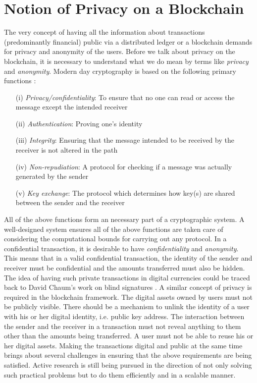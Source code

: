 \section{Notion of Privacy on a Blockchain}

The very concept of having all the information about transactions (predominantly financial) public via a distributed ledger or a blockchain demands for privacy and anonymity of the users.
Before we talk about privacy on the blockchain, it is necessary to understand what we do mean by terms like \textit{privacy} and \textit{anonymity}.
Modern day cryptography is based on the following primary functions \cite{kesler98}:
\begin{enumerate}
    \item[(i)] \textit{Privacy/confidentiality}: To ensure that no one can read or access the message except the intended receiver
    \item[(ii)] \textit{Authentication}: Proving one's identity
    \item[(iii)] \textit{Integrity}: Ensuring that the message intended to be received by the receiver is not altered in the path
    \item[(iv)] \textit{Non-repudiation}: A protocol for checking if a message was actually generated by the sender
    \item[(v)] \textit{Key exchange}: The protocol which determines how key(s) are shared between the sender and the receiver
\end{enumerate}

All of the above functions form an necessary part of a cryptographic system. A well-designed system ensures all of the above functions are taken care of considering the computational bounds for carrying out any protocol.
In a confidential transaction, it is desirable to have \textit{confidentiality} and \textit{anonymity}. 
This means that in a valid confidential transaction, the identity of the sender and receiver must be confidential and the amounts transferred must also be hidden. 
The idea of having such private transactions in digital currencies could be traced back to David Chaum's work on blind signatures \cite{chaum82}.
A similar concept of privacy is required in the blockchain framework. 
The digital assets owned by users must not be publicly visible.
There should be a mechanism to unlink the identity of a user with his or her digital identity, i.e. public key address. 
The interaction between the sender and the receiver in a transaction must not reveal anything to them other than the amounts being transferred.
A user must not be able to reuse his or her digital assets. 
Making the transactions digital and public at the same time brings about several challenges in ensuring that the above requirements are being satisfied.
Active research is still being pursued in the direction of not only solving such practical problems but to do them efficiently and in a scalable manner.

